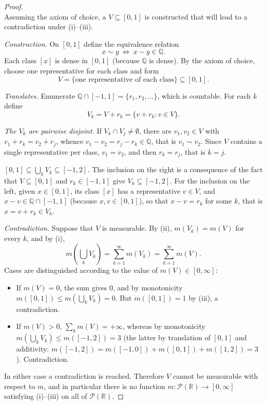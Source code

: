 \documentclass[11pt, a4paper]{article}
\begin{document}
\begin{proof}\leavevmode\\
Assuming the axiom of choice, a $V \subseteq [0, 1]$ is constructed that will lead to a
contradiction under (i)--(iii).

\textit{Construction.} On $[0, 1]$ define the equivalence relation
$$ x \sim y \ \Leftrightarrow \ x - y \in \mathbb{Q}. $$
Each class $[x]$ is dense in $[0, 1]$ (because $\mathbb{Q}$ is dense). By the axiom of choice,
choose one representative for each class and form
$$ V = \{\text{one representative of each class}\} \subseteq [0, 1]. $$

\textit{Translates.} Enumerate $\mathbb{Q} \cap [-1, 1] = \{r_1, r_2, \dots\}$, which is countable.
For each $k$ define
$$ V_k = V + r_k = \{v + r_k : v \in V\}. $$

\textit{The $V_k$ are pairwise disjoint.} If $V_k \cap V_j \ne \emptyset$, there are $v_1, v_2 \in
V$ with $v_1 + r_k = v_2 + r_j$, whence $v_1 - v_2 = r_j - r_k \in \mathbb{Q}$, that is
$v_1 \sim v_2$. Since $V$ contains a single representative per class, $v_1 = v_2$, and then
$r_k = r_j$, that is $k = j$.

\textit{$[0, 1] \subseteq \bigcup_k V_k \subseteq [-1, 2]$.} The inclusion on the right is a
consequence of the fact that $V \subseteq [0, 1]$ and $r_k \in [-1, 1]$ give $V_k \subseteq [-1, 2]$. For the
inclusion on the left, given $x \in [0, 1]$, its class $[x]$ has a representative $v \in V$,
and $x - v \in \mathbb{Q} \cap [-1, 1]$ (because $x, v \in [0, 1]$), so that $x - v = r_k$ for
some $k$, that is $x = v + r_k \in V_k$.

\textit{Contradiction.} Suppose that $V$ is measurable. By (ii), $m(V_k) = m(V)$ for every $k$,
and by (i),
$$ m\!\left(\bigcup_k V_k\right) = \sum_{k=1}^\infty m(V_k) = \sum_{k=1}^\infty m(V). $$
Cases are distinguished according to the value of $m(V) \in [0, \infty]$:
\begin{itemize}
    \item If $m(V) = 0$, the sum gives $0$, and by monotonicity $m([0, 1]) \le m(\bigcup_k V_k) = 0$.
    But $m([0, 1]) = 1$ by (iii), a contradiction.
    \item If $m(V) > 0$, $\sum_k m(V) = +\infty$, whereas by monotonicity $m(\bigcup_k V_k)
    \le m([-1, 2]) = 3$ (the latter by translation of $[0, 1]$ and additivity: $m([-1, 2]) =
    m([-1, 0]) + m([0, 1]) + m([1, 2]) = 3$). Contradiction.
\end{itemize}
In either case a contradiction is reached. Therefore $V$ cannot be measurable with respect to $m$, and
in particular there is no function $m: \mathcal{P}(\mathbb{R}) \to [0, \infty]$ satisfying
(i)--(iii) on all of $\mathcal{P}(\mathbb{R})$.
\end{proof}
\end{document}
